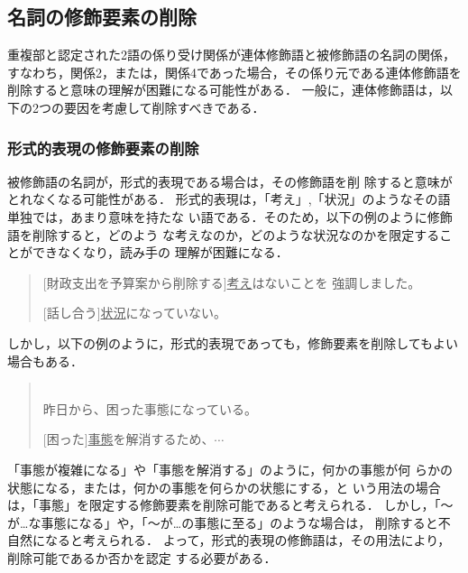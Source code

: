 \subsection{名詞の修飾要素の削除} \label{sakujo_meishi}
重複部と認定された2語の係り受け関係が連体修飾語と被修飾語の名詞の関係，
すなわち，関係2，または，関係4であった場合，その係り元である連体修飾語を
削除すると意味の理解が困難になる可能性がある．
一般に，連体修飾語は，以下の2つの要因を考慮して削除すべきである．

\subsubsection{形式的表現の修飾要素の削除} \label{sakujo_meishi_keishiki}
被修飾語の名詞が，形式的表現\cite{mikami99}である場合は，その修飾語を削
除すると意味がとれなくなる可能性がある．
形式的表現は，「考え」,「状況」のようなその語単独では，あまり意味を持たな
い語である．そのため，以下の例のように修飾語を削除すると，どのよう
な考えなのか，どのような状況なのかを限定することができなくなり，読み手の
理解が困難になる．
\vspace{5mm}
\begin{quote} \label{rei:rei7}
\hspace*{-1em}{\bf 例7：}

 [財政支出を予算案から削除する]\underline{考え}はないことを
 強調しました。

 [話し合う]\underline{状況}になっていない。
\end{quote}\vspace{5mm}
しかし，以下の例のように，形式的表現であっても，修飾要素を削除してもよい
場合もある．
\vspace{5mm}\begin{quote} \label{rei:rei8}
\hspace*{-1em}{\bf 例8：}\\
昨日から、困った事態になっている。

[困った]\underline{事態}を解消するため、$\cdots$
\end{quote}\vspace{5mm}
「事態が複雑になる」や「事態を解消する」のように，何かの事態が何
らかの状態になる，または，何かの事態を何らかの状態にする，と
いう用法の場合は，「事態」を限定する修飾要素を削除可能であると考えられる．
しかし，「〜が…な事態になる」や，「〜が…の事態に至る」のような場合は，
削除すると不自然になると考えられる．
よって，形式的表現の修飾語は，その用法により，削除可能であるか否かを認定
する必要がある．

